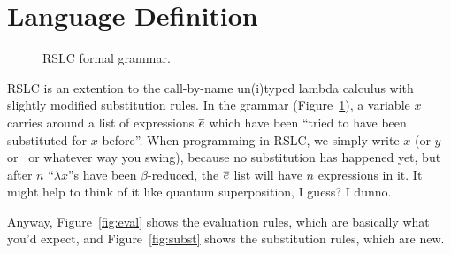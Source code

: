 \documentclass[10pt]{sigplanconf}
\begin{document}
\section{Language Definition}

\begin{figure}[t]
	\Grammar
	\caption{RSLC formal grammar.}
	\label{fig:grammar}
\end{figure}

RSLC is an extention to the call-by-name un(i)typed lambda calculus with slightly modified substitution rules. In the grammar (Figure~\ref{fig:grammar}), a variable $x$ carries around a list of expressions $\overline{e}$ which have been ``tried to have been substituted for $x$ before''.
When programming in RSLC, we simply write $x$ (or $y$ or \Neptune~or whatever way you swing), because no substitution has happened yet, but after $n$ ``$\lambda x$''s have been $\beta$-reduced, the $\overline{e}$ list will have $n$ expressions in it.
It might help to think of it like quantum superposition, I guess? I dunno.

Anyway, Figure~\ref{fig:eval} shows the evaluation rules, which are basically what you'd expect, and Figure~\ref{fig:subst} shows the substitution rules, which are new.




\end{document}
